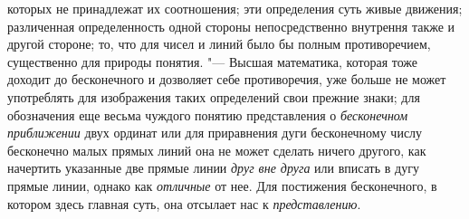 {которых не принадлежат их соотношения; эти определения суть живые движения;
различенная определенность одной стороны непосредственно внутрення также и
другой стороне; то, что для чисел и линий было бы полным
противоречием, существенно для природы понятия. "--- Высшая
математика, которая тоже доходит до бесконечного и дозволяет себе
противоречия, уже больше не может употреблять для изображения таких
определений свои прежние знаки; для обозначения еще весьма чуждого понятию
представления о {\em бесконечном
приближении} двух ординат или для приравнения дуги
бесконечному числу бесконечно малых прямых линий она не может сделать
ничего другого, как начертить указанные две прямые линии
{\em друг вне друга} или
вписать в дугу прямые линии, однако как
{\em отличные} от нее.
Для постижения бесконечного, в котором здесь главная суть, она отсылает нас
к {\em представлению}.

}
